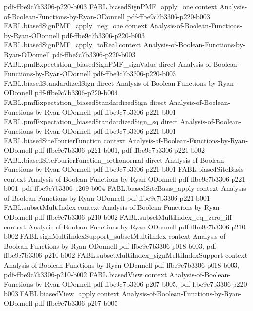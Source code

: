\begin{theorem}
  {pdf-ffbe9c7b3306-p220-b003}
\proofstep
  {FABL.biasedSignPMF_apply_one}
  {context}
  {Analysis-of-Boolean-Functions-by-Ryan-ODonnell}
  {pdf-ffbe9c7b3306-p220-b003}
\proofstep
  {FABL.biasedSignPMF_apply_neg_one}
  {context}
  {Analysis-of-Boolean-Functions-by-Ryan-ODonnell}
  {pdf-ffbe9c7b3306-p220-b003}
\proofstep
  {FABL.biasedSignPMF_apply_toReal}
  {context}
  {Analysis-of-Boolean-Functions-by-Ryan-ODonnell}
  {pdf-ffbe9c7b3306-p220-b003}
\proofstep
  {FABL.pmfExpectation_biasedSignPMF_signValue}
  {direct}
  {Analysis-of-Boolean-Functions-by-Ryan-ODonnell}
  {pdf-ffbe9c7b3306-p220-b003}
\proofstep
  {FABL.biasedStandardizedSign}
  {direct}
  {Analysis-of-Boolean-Functions-by-Ryan-ODonnell}
  {pdf-ffbe9c7b3306-p220-b004}
\proofstep
  {FABL.pmfExpectation_biasedStandardizedSign}
  {direct}
  {Analysis-of-Boolean-Functions-by-Ryan-ODonnell}
  {pdf-ffbe9c7b3306-p221-b001}
\proofstep
  {FABL.pmfExpectation_biasedStandardizedSign_sq}
  {direct}
  {Analysis-of-Boolean-Functions-by-Ryan-ODonnell}
  {pdf-ffbe9c7b3306-p221-b001}
\proofstep
  {FABL.biasedSiteFourierFunction}
  {context}
  {Analysis-of-Boolean-Functions-by-Ryan-ODonnell}
  {pdf-ffbe9c7b3306-p221-b001,
    pdf-ffbe9c7b3306-p221-b002}
\proofstep
  {FABL.biasedSiteFourierFunction_orthonormal}
  {direct}
  {Analysis-of-Boolean-Functions-by-Ryan-ODonnell}
  {pdf-ffbe9c7b3306-p221-b001}
\proofstep
  {FABL.biasedSiteBasis}
  {context}
  {Analysis-of-Boolean-Functions-by-Ryan-ODonnell}
  {pdf-ffbe9c7b3306-p221-b001,
    pdf-ffbe9c7b3306-p209-b004}
\proofstep
  {FABL.biasedSiteBasis_apply}
  {context}
  {Analysis-of-Boolean-Functions-by-Ryan-ODonnell}
  {pdf-ffbe9c7b3306-p221-b001}
\proofstep
  {FABL.subsetMultiIndex}
  {context}
  {Analysis-of-Boolean-Functions-by-Ryan-ODonnell}
  {pdf-ffbe9c7b3306-p210-b002}
\proofstep
  {FABL.subsetMultiIndex_eq_zero_iff}
  {context}
  {Analysis-of-Boolean-Functions-by-Ryan-ODonnell}
  {pdf-ffbe9c7b3306-p210-b002}
\proofstep
  {FABL.signMultiIndexSupport_subsetMultiIndex}
  {context}
  {Analysis-of-Boolean-Functions-by-Ryan-ODonnell}
  {pdf-ffbe9c7b3306-p018-b003,
    pdf-ffbe9c7b3306-p210-b002}
\proofstep
  {FABL.subsetMultiIndex_signMultiIndexSupport}
  {context}
  {Analysis-of-Boolean-Functions-by-Ryan-ODonnell}
  {pdf-ffbe9c7b3306-p018-b003,
    pdf-ffbe9c7b3306-p210-b002}
\proofstep
  {FABL.biasedView}
  {context}
  {Analysis-of-Boolean-Functions-by-Ryan-ODonnell}
  {pdf-ffbe9c7b3306-p207-b005,
    pdf-ffbe9c7b3306-p220-b003}
\proofstep
  {FABL.biasedView_apply}
  {context}
  {Analysis-of-Boolean-Functions-by-Ryan-ODonnell}
  {pdf-ffbe9c7b3306-p207-b005}
\proofstep

\end{theorem}
